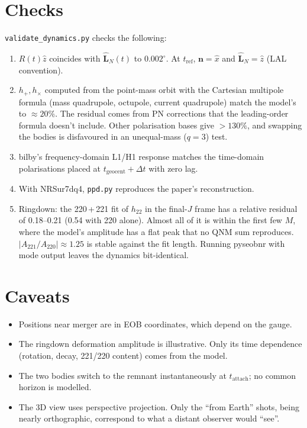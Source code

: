 \documentclass[11pt,a4paper]{article}
\newcommand{\code}[1]{\texttt{#1}}
\newcommand{\vect}[1]{\boldsymbol{#1}}
\begin{document}
\section{Checks}\label{sec:checks}

\code{validate\_dynamics.py} checks the following:
\begin{enumerate}
  \item $R(t)\hat z$ coincides with $\hat{\vect{L}}_N(t)$ to $0.002^\circ$. At
        $t_\mathrm{ref}$, $\vect{n}=\hat x$ and $\hat{\vect{L}}_N = \hat z$ (LAL convention).
  \item $h_+, h_\times$ computed from the point-mass orbit with the Cartesian multipole
        formula (mass quadrupole, octupole, current quadrupole) match the model's to
        $\approx20\%$. The residual comes from PN corrections that the leading-order
        formula doesn't include. Other polarisation bases give $>130\%$, and swapping the
        bodies is disfavoured in an unequal-mass ($q=3$) test.
  \item bilby's frequency-domain L1/H1 response matches the time-domain polarisations
        placed at $t_\mathrm{geocent}+\Delta t$ with zero lag.
  \item With NRSur7dq4, \code{ppd.py} reproduces the paper's reconstruction.
  \item Ringdown: the 220\,+\,221 fit of $h_{22}$ in the final-$J$ frame has a relative
        residual of 0.18--0.21 (0.54 with 220 alone). Almost all of it is within the first
        few $M$, where the model's amplitude has a flat peak that no QNM sum reproduces.
        $|A_{221}/A_{220}|\approx1.25$ is stable against the fit length. Running pyseobnr
        with mode output leaves the dynamics bit-identical.
\end{enumerate}

\section{Caveats}

\begin{itemize}
  \item Positions near merger are in EOB coordinates, which depend on the gauge.
  \item The ringdown deformation amplitude is illustrative. Only its time dependence
        (rotation, decay, 221/220 content) comes from the model.
  \item The two bodies switch to the remnant instantaneously at $t_\mathrm{attach}$; no
        common horizon is modelled.
  \item The 3D view uses perspective projection. Only the ``from Earth'' shots, being
        nearly orthographic, correspond to what a distant observer would ``see''.
\end{itemize}
\end{document}
